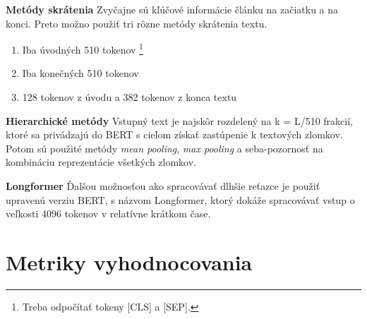 \textbf{Metódy skrátenia} Zvyčajne sú kľúčové informácie článku na začiatku a na konci. Preto možno použiť tri rôzne metódy skrátenia textu.
\begin{enumerate}
    \item Iba úvodných 510 tokenov \footnote{Treba odpočítať tokeny [CLS] a [SEP].}
    \item Iba konečných 510 tokenov
    \item 128 tokenov z úvodu a 382 tokenov z konca textu
\end{enumerate}

\textbf{Hierarchické metódy} Vstupný text je najskôr rozdelený na k = L/510 frakcií, ktoré sa privádzajú do BERT s cieľom získať zastúpenie k textových zlomkov. Potom sú použité metódy \textit{mean pooling}, \textit{max pooling} a seba-pozornosť na kombináciu reprezentácie všetkých zlomkov.\cite{Sun:2019}

\textbf{Longformer} \cite{Beltagy:2020} Ďalšou možnosťou ako spracovávať dlhšie reťazce je použiť upravenú verziu BERT, s názvom Longformer, ktorý dokáže spracovávať vstup o veľkosti 4096 tokenov v relatívne krátkom čase.


\section{Metriky vyhodnocovania} \label{metriky}

